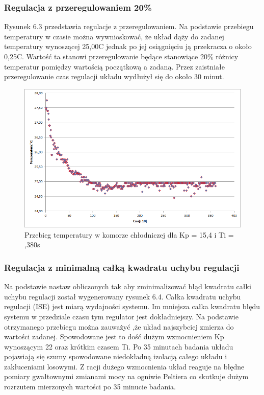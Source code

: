 \documentclass[oneside]{mgr}
\begin{document}
\subsubsection{Regulacja z przeregulowaniem 20\%}
Rysunek 6.3 przedstawia regulacje z przeregulowaniem. Na podstawie przebiegu temperatury w czasie można wywnioskować, że układ dąży do zadanej temperatury wynoszącej 25,00\textdegree{}C jednak po jej osiągnięciu ją przekracza o około 0,25\textdegree{}C. Wartość ta stanowi przeregulowanie będące stanowiące 20\% różnicy temperatur pomiędzy wartością początkową a zadaną. Przez zaistniałe przeregulowanie czas regulacji układu wydłużył się do około 30 minut.
\begin{center}
\begin{figure}[h!]
    \centering
    \includegraphics[width=\textwidth]{ZN12.png}
    \caption{Przebieg temperatury w komorze chłodniczej dla Kp = 15,4 i Ti = ,380s}
    \end{figure}
\end{center}

\subsubsection{Regulacja z minimalną całką kwadratu uchybu regulacji}
Na podstawie nastaw obliczonych tak aby zminimalizować błąd kwadratu całki uchybu regulacji został wygenerowany rysunek 6.4. Całka kwadratu uchybu regulacji (ISE) jest miarą wydajności systemu. Im mniejsza całka kwadratu błędu systemu w przedziale czasu tym regulator jest dokładniejszy. Na podstawie otrzymanego przebiegu można zauważyć ,że układ najszybciej zmierza do wartości zadanej. Spowodowane jest to dość dużym wzmocnieniem Kp wynoszącym 22 oraz krótkim czasem Ti. Po 35 minutach badania układu pojawiają się szumy spowodowane niedokładną izolacją całego układu i zakłuceniami losowymi. Z racji dużego wzmocnienia układ reaguje na błędne pomiary gwałtownymi zmianami mocy na ogniwie Peltiera co skutkuje dużym rozrzutem mierzonych wartości po 35 minucie badania. 
\end{document}
